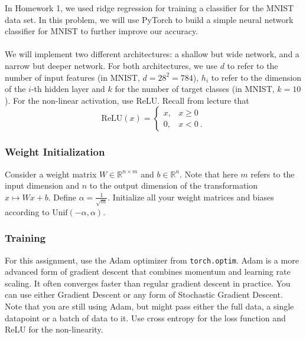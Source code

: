 \documentclass{article}
\begin{document}
\begin{aprob}
    \label{code-nn-mnist}
    In Homework 1, we used ridge regression for training a classifier for the MNIST data set.
    In this problem, we will use PyTorch to build a simple neural network classifier for MNIST to further improve our accuracy.\\\\
    We will implement two different architectures: a shallow but wide network, and a narrow but deeper network. For both architectures,
    we use $d$ to refer to the number of input features (in MNIST, $d=28^2 = 784$), $h_i$ to refer to the dimension of the $i$-th hidden layer and $k$ for the number of target classes (in MNIST, $k=10$). For the non-linear activation, use ReLU. Recall from lecture that
    \[ \text{ReLU}(x) = \begin{cases} 
          x, & x \geq 0 \\
          0, & x < 0 \ .
       \end{cases}
    \]
    \subsubsection*{Weight Initialization}
    Consider a weight matrix $W \in \mathbb{R}^{n \times m}$ and $b \in \mathbb{R}^n$. Note that here $m$ refers to the input dimension and
    $n$ to the output dimension of the transformation $x \mapsto Wx + b$. Define $\alpha = \frac{1}{\sqrt{m}}$.
    Initialize all your weight matrices and biases according to $\text{Unif}(-\alpha, \alpha)$.
    
    \subsubsection*{Training}
    For this assignment, use the Adam optimizer from \texttt{torch.optim}. Adam is a more advanced form of gradient descent that combines momentum and learning rate scaling. It often converges faster than regular gradient descent in practice. You can use either Gradient Descent or any form of Stochastic Gradient Descent. Note that you are still using Adam, but might pass either the full data, a single datapoint or a batch of data to it. Use cross entropy for the loss function and ReLU for the non-linearity.

\end{aprob}
\end{document}
